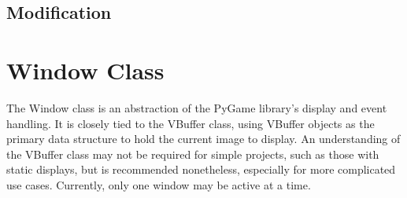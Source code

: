 \documentclass[letterpaper,10pt,english]{sphinxmanual}
\begin{document}
\section{Modification}
\label{\detokenize{fundamentals:modification}}
\def\sphinxLiteralBlockLabel{\label{\detokenize{fundamentals:id8}}}
\begin{sphinxVerbatim}[commandchars=\\\{\}]
  
\PYG{p}{[}\PYG{p}{]}  
\end{sphinxVerbatim}
\def\sphinxLiteralBlockLabel{\label{\detokenize{fundamentals:id9}}}
\begin{sphinxVerbatim}[commandchars=\\\{\}]
  
\PYG{p}{[}\PYG{p}{]}  
\end{sphinxVerbatim}
\def\sphinxLiteralBlockLabel{\label{\detokenize{fundamentals:id10}}}
\begin{sphinxVerbatim}[commandchars=\\\{\}]
  
\end{sphinxVerbatim}
\def\sphinxLiteralBlockLabel{\label{\detokenize{fundamentals:id11}}}
\begin{sphinxVerbatim}[commandchars=\\\{\}]
\end{sphinxVerbatim}


\chapter{Window Class}
\label{\detokenize{fundamentals:window-class}}
\sphinxAtStartPar
The Window class is an abstraction of the PyGame library’s display and event handling. It is closely tied to the VBuffer class, using VBuffer objects as the primary data structure to hold the current image to display. An understanding of the VBuffer class may not be required for simple projects, such as those with static displays, but is recommended nonetheless, especially for more complicated use cases. Currently, only one window may be active at a time.
\end{document}
